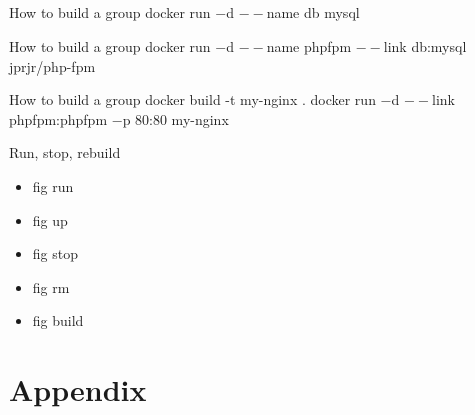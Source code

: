\documentclass{beamer}
\begin{document}
    \subsection{}
    \begin{frame}{How to build a group}
        docker run $-$d $--$name db mysql\\
        \lstFigYmlMysql
    \end{frame}
    \begin{frame}{How to build a group}
        docker run $-$d $--$name phpfpm $--$link db:mysql jprjr/php-fpm\\
        \lstFigYmlPhpFpm
    \end{frame}
    \begin{frame}{How to build a group}
        docker build -t my-nginx .
        docker run $-$d $--$link phpfpm:phpfpm $-$p 80:80 my-nginx\\
        \lstFigYmlNginx
    \end{frame}
    \begin{frame}{Run, stop, rebuild}
        \begin{itemize}
            \item fig run
            \item fig up
            \item fig stop
            \item fig rm
            \item fig build
        \end{itemize}
    \end{frame}
    \section{Appendix}
\end{document}
